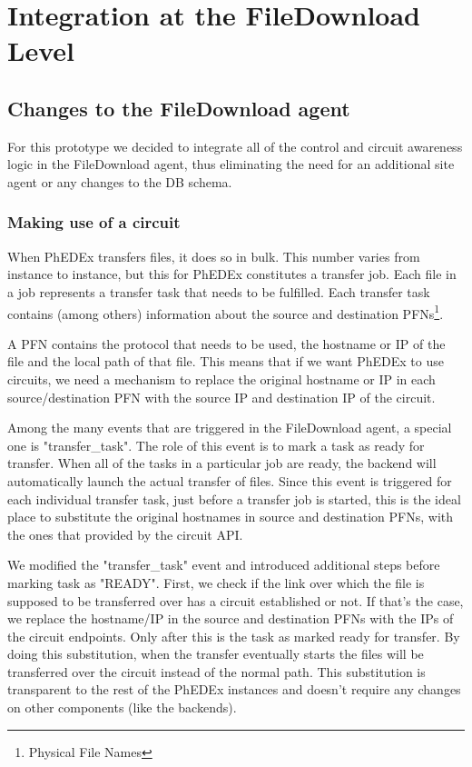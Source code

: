 \section{Integration at the FileDownload Level}

\subsection{Changes to the FileDownload agent}

For this prototype we decided to integrate all of the control and circuit awareness
logic in the FileDownload agent, thus eliminating the need for an additional site 
agent or any changes to the DB schema.



\subsubsection{Making use of a circuit}

When PhEDEx transfers files, it does so in bulk. This number varies from instance
to instance, but this for PhEDEx constitutes a transfer job. Each file in a job
represents a transfer task that needs to be fulfilled. Each transfer task contains
(among others) information about the source and destination PFNs\footnote{Physical File Names}.

A PFN contains the protocol that needs to be used, the hostname or IP of the file
and the local path of that file. This means that if we want PhEDEx to use
circuits, we need a mechanism to replace the original hostname or IP in each 
source/destination PFN with the source IP and destination IP of the circuit.

Among the many events that are triggered in the FileDownload agent, a special one 
is "transfer\_task". The role of this event is to mark a task as ready for transfer. 
When all of the tasks in a particular job are ready, the backend will automatically 
launch the actual transfer of files. Since this event is triggered for each individual
transfer task, just before a transfer job is started, this is the ideal place to
substitute the original hostnames in source and destination PFNs, with the ones
that provided by the circuit API.

We modified the "transfer\_task" event and introduced additional steps before
marking task as "READY". First, we check if the link over which the file is
supposed to be transferred over has a circuit established or not. If that's the
case, we replace the hostname/IP in the source and destination PFNs with the
IPs of the circuit endpoints. Only after this is the task as marked ready for
transfer. By doing this substitution, when the transfer eventually starts
the files will be transferred over the circuit instead of the normal path. This
substitution is transparent to the rest of the PhEDEx instances and doesn't 
require any changes on other components (like the backends).

